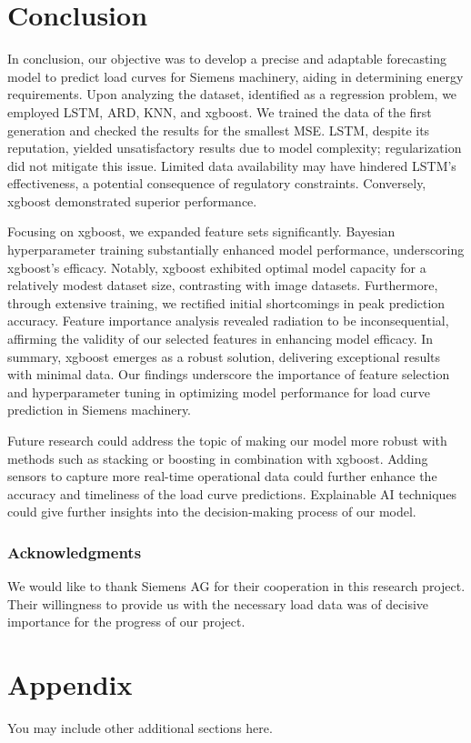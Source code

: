 \documentclass{article} %
\begin{document}
\section{Conclusion}
In conclusion, our objective was to develop a precise and adaptable forecasting model to predict load curves for Siemens machinery, aiding in determining energy requirements. Upon analyzing the dataset, identified as a regression problem, we employed \gls{LSTM}, \gls{ARD}, \gls{KNN}, and \gls{xgboost}. We trained the data of the first generation and checked the results for the smallest \gls{MSE}. \gls{LSTM}, despite its reputation, yielded unsatisfactory results due to model complexity; regularization did not mitigate this issue. Limited data availability may have hindered \gls{LSTM}'s effectiveness, a potential consequence of regulatory constraints. Conversely, \gls{xgboost} demonstrated superior performance. 

Focusing on \gls{xgboost}, we expanded feature sets significantly. Bayesian hyperparameter training substantially enhanced model performance, underscoring \gls{xgboost}'s efficacy. Notably, \gls{xgboost} exhibited optimal model capacity for a relatively modest dataset size, contrasting with image datasets. Furthermore, through extensive training, we rectified initial shortcomings in peak prediction accuracy. Feature importance analysis revealed radiation to be inconsequential, affirming the validity of our selected features in enhancing model efficacy. In summary, \gls{xgboost} emerges as a robust solution, delivering exceptional results with minimal data. Our findings underscore the importance of feature selection and hyperparameter tuning in optimizing model performance for load curve prediction in Siemens machinery. 

Future research could address the topic of making our model more robust with methods such as stacking or boosting in combination with \gls{xgboost}. Adding sensors to capture more real-time operational data could further enhance the accuracy and timeliness of the load curve predictions. Explainable AI techniques could give further insights into the decision-making process of our model.

\subsubsection*{Acknowledgments}
We would like to thank Siemens AG for their cooperation in this research project. Their willingness to provide us with the necessary load data was of decisive importance for the progress of our project.





\appendix
\section{Appendix}
You may include other additional sections here.
\end{document}
